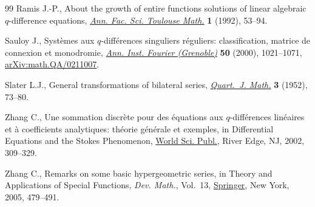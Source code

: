 \documentclass[pdftex]{sigma}
\numberwithin{equation}{section}
\begin{document}
\begin{thebibliography}{99}
Ramis J.-P., About the growth of entire functions solutions of linear algebraic
 {$q$}-difference equations, \href{https://doi.org/10.5802/afst.739}{\textit{Ann. Fac. Sci. Toulouse Math.}} \textbf{1}
 (1992), 53--94.

Sauloy J., Syst\`emes aux {$q$}-diff\'{e}rences singuliers r\'{e}guliers:
 classification, matrice de connexion et monodromie, \href{https://doi.org/10.5802/aif.1784}{\textit{Ann. Inst.
 Fourier (Grenoble)}} \textbf{50} (2000), 1021--1071, \href{https://arxiv.org/abs/math.QA/0211007}{arXiv:math.QA/0211007}.

Slater L.J., General transformations of bilateral series, \href{https://doi.org/10.1093/qmath/3.1.73}{\textit{Quart.~J.
 Math.}} \textbf{3} (1952), 73--80.

Zhang C., Une sommation discr\`ete pour des \'{e}quations aux
 {$q$}-diff\'{e}rences lin\'{e}aires et \`a coefficients analytiques:
 th\'{e}orie g\'{e}n\'{e}rale et exemples, in Differential Equations and the
 {S}tokes Phenomenon, \href{https://doi.org/10.1142/9789812776549_0012}{World Sci. Publ.}, River Edge, NJ, 2002, 309--329.

Zhang C., Remarks on some basic hypergeometric series, in Theory and
 Applications of Special Functions, \textit{Dev. Math.}, Vol.~13, \href{https://doi.org/10.1007/0-387-24233-3_22}{Springer},
 New York, 2005, 479--491.

\end{thebibliography}\LastPageEnding
\end{document}
